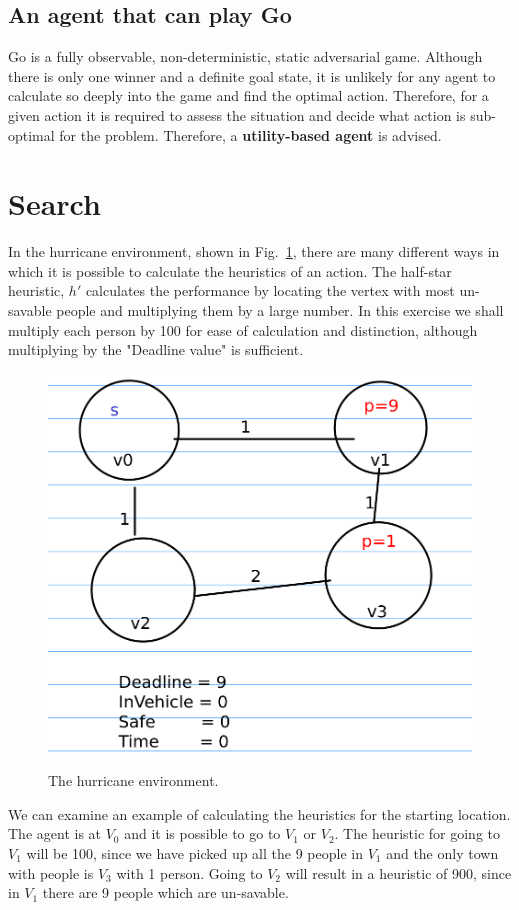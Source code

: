 \documentclass{article}                     %
\begin{document}
	\subsection{An agent that can play Go}
	Go is a fully observable, non-deterministic, static adversarial game. Although there is only one winner and a definite goal state, it is unlikely for any agent to calculate so deeply into the game and find the optimal action. Therefore, for a given action it is required to assess the situation and decide what action is sub-optimal for the problem. Therefore, a \textbf{utility-based agent} is advised.
	
	\section{Search}
	In the hurricane environment, shown in Fig.~\ref{fig:environment}, there are many different ways in which it is possible to calculate the heuristics of an action. The half-star heuristic, $ h' $ calculates the performance by locating the vertex with most un-savable people and multiplying them by a large number. In this exercise  we shall multiply each person by 100 for ease of calculation and distinction, although multiplying by the "Deadline value" is sufficient.
	
	\begin{figure}
		\centering
		\includegraphics[width=0.5\linewidth]{environment}
		\caption{The hurricane environment.}
		\label{fig:environment}
	\end{figure}
	
	
	We can examine an example of calculating the heuristics for the starting location. The agent is at $ V_0 $ and it is possible to go to $ V_1 $ or $ V_2 $. The heuristic for going to $ V_1 $ will be 100, since we have picked up all the 9 people in $ V_1 $ and the only town with people is $ V_3 $ with 1 person. Going to $ V_2 $ will result in a heuristic of 900, since in $ V_1 $ there are 9 people which are un-savable.
	
\end{document}
